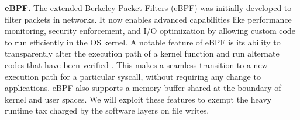 \textbf{eBPF.}
The extended Berkeley Packet Filters (eBPF) \cite{ebpf} was initially developed to filter packets in networks. It now enables advanced capabilities like performance monitoring, security enforcement, and I/O optimization by allowing custom code to run efficiently in the OS kernel.
A notable feature of eBPF is its ability to transparently alter the execution path of a kernel function and run alternate codes that have been verified \cite{ebpf,280870,DBLP:conf/osdi/ZhengY0HL0Q25}.
This makes a seamless transition to a new execution path for a particular syscall, without requiring any change to applications.
eBPF also supports a memory buffer shared at the boundary of kernel and user spaces.
We will exploit these features to exempt the heavy runtime tax charged by the software layers on
file writes.


